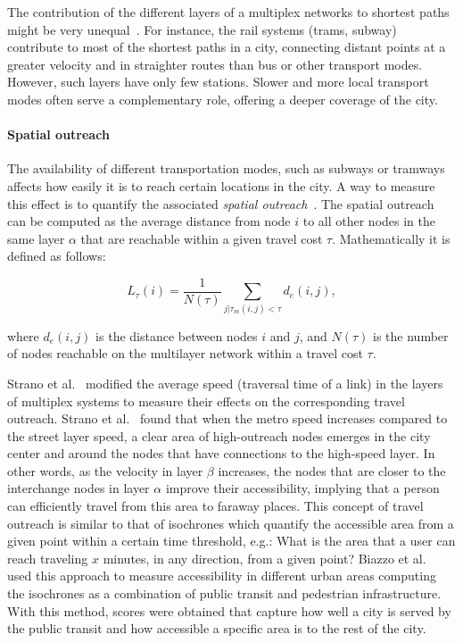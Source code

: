 The contribution of the different layers of a multiplex networks to shortest paths might be very unequal~\cite{Aleta2017Multilayer}. For instance, the rail systems (trams, subway) contribute to most of the shortest paths in a city, connecting distant points at a greater velocity and in straighter routes than bus or other transport modes. However, such layers have only few stations. Slower and more local transport modes often serve a complementary role, offering a deeper coverage of the city.

\paragraph*{Spatial outreach}
The availability of different transportation modes, such as subways or tramways affects how easily it is to reach certain locations in the city. A way to measure this effect is to quantify the associated \textit{spatial outreach}~\cite{strano2015features}. The spatial outreach can be computed as the average distance from node $i$ to all other nodes in the same layer $\alpha$ that are reachable within a given travel cost $\tau$. Mathematically it is defined as follows:

\begin{equation}
    L_\tau(i)=\frac{1}{N(\tau)}\sum_{j|\tau_{m}(i,j)<\tau}d_e(i,j),
    \label{eq:outreach}
\end{equation}

where $d_e(i,j)$ is the distance between nodes $i$ and $j$, and $N(\tau)$ is the number of nodes reachable on the multilayer network within a travel cost $\tau$.

Strano et al.~\cite{strano2015features} modified the average speed (traversal time of a link) in the layers of multiplex systems to measure their effects on the corresponding travel outreach. Strano et al.~\cite{strano2015features} found that when the metro speed increases compared to the street layer speed, a clear area of high-outreach nodes emerges in the city center and around the nodes that have connections to the high-speed layer. In other words, as the velocity in layer $\beta$ increases, the nodes that are closer to the interchange nodes in layer $\alpha$ improve their accessibility, implying that a person can efficiently travel from this area to faraway places. This concept of travel outreach is similar to that of isochrones which quantify the accessible area from a given point within a certain time threshold, e.g.: What is the area that a user can reach traveling $x$ minutes, in any direction, from a given point? Biazzo et al.~\cite{biazzo2019accesibility} used this approach to measure accessibility in different urban areas computing the isochrones as a combination of public transit and pedestrian infrastructure. With this method, scores were obtained that capture how well a city is served by the public transit and how accessible a specific area is to the rest of the city.


